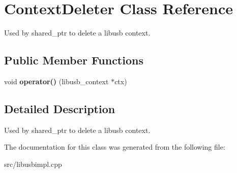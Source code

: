 \hypertarget{class_context_deleter}{\section{Context\-Deleter Class Reference}
\label{class_context_deleter}
}


Used by shared\-\_\-ptr to delete a libusb context.  


\subsection*{Public Member Functions}
\begin{DoxyCompactItemize}
\item 
\hypertarget{class_context_deleter_a15cf5ffa1f4c0b818c7720146baa1635}{void {\bfseries operator()} (libusb\-\_\-context $\ast$ctx)}\label{class_context_deleter_a15cf5ffa1f4c0b818c7720146baa1635}

\end{DoxyCompactItemize}


\subsection{Detailed Description}
Used by shared\-\_\-ptr to delete a libusb context. 

The documentation for this class was generated from the following file\-:\begin{DoxyCompactItemize}
\item 
src/libusbimpl.\-cpp\end{DoxyCompactItemize}
